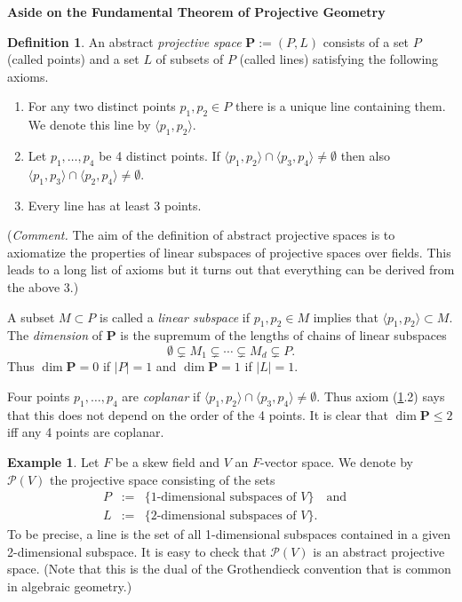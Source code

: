 \documentclass{amsart}
\theoremstyle{definition}
\newtheorem{defn}[thm]{Definition}
\newtheorem{exmp}[thm]{Example}
\theoremstyle{remark}
\newcommand{\qtq}[1]{\quad\mbox{#1}\quad}
\begin{document}
\medskip
{\bf Aside on the Fundamental Theorem of Projective Geometry}
\medskip



\begin{defn} \label{abst.proj.sp.defn}
An abstract  {\it projective space}  ${\mathbf P}:=(P, L)$ 
consists of  a set  $P$ 
(called  points) and  a set  $L$ of subsets of $P$ (called  lines) satisfying the following axioms.
\begin{enumerate}
\item For any two distinct points $p_1,p_2\in P$ there is a unique  line containing them. We denote this line by $\langle p_1, p_2\rangle$.
\item Let $p_1,\dots, p_4$ be 4 distinct points. If
$\langle p_1, p_2\rangle\cap \langle p_3, p_4\rangle\neq \emptyset$
then also $\langle p_1, p_3\rangle\cap \langle p_2, p_4\rangle\neq \emptyset$.
\item  Every line has at least 3 points.
\end{enumerate} 
({\it Comment.} The aim of the definition of  abstract  projective spaces is to axiomatize the properties of linear subspaces of  projective spaces over fields. This leads to a long list of axioms but it turns out that everything can be derived from the above 3.) 

A subset $M\subset P$ is called a {\it linear subspace} if
 $p_1,p_2\in M$ implies that  $\langle p_1, p_2\rangle\subset M$. 
The {\it dimension} of ${\mathbf P}$ is the supremum of the lengths of  chains of linear subspaces
$$
\emptyset\subsetneq M_1\subsetneq \cdots \subsetneq M_d \subsetneq P.
$$
Thus  $\dim {\mathbf P}=0$ if $|P|=1$ and 
$\dim {\mathbf P}= 1$ if $|L|=1$.


Four points $p_1,\dots, p_4$ are {\it coplanar} if 
$\langle p_1, p_2\rangle\cap \langle p_3, p_4\rangle\neq \emptyset$.
Thus axiom (\ref{abst.proj.sp.defn}.2) says that this does not depend on the order of the 4 points.
It is clear that   $\dim {\mathbf P}\leq 2$ iff   any 4 points are coplanar.
\end{defn}

\begin{exmp}\label{subspacelatt.defn}
 Let $F$ be a skew field and $V$ an $F$-vector space.
We denote by   ${\mathcal P}(V)$  the  projective space consisting of the sets
$$
\begin{array}{rcl}
P & := & \{\mbox{1-dimensional subspaces of $V$}\} \qtq{and}\\
L & := & \{\mbox{2-dimensional subspaces of $V$}\}.
\end{array} 
$$
To be precise, a line is the set of all 1-dimensional subspaces
contained in a given 2-dimensional subspace.
It is easy to check that  ${\mathcal P}(V)$  is an abstract  projective space. 
 (Note that this is the dual of the Grothendieck convention that is
common in algebraic geometry.)
\end{exmp}
\end{document}
